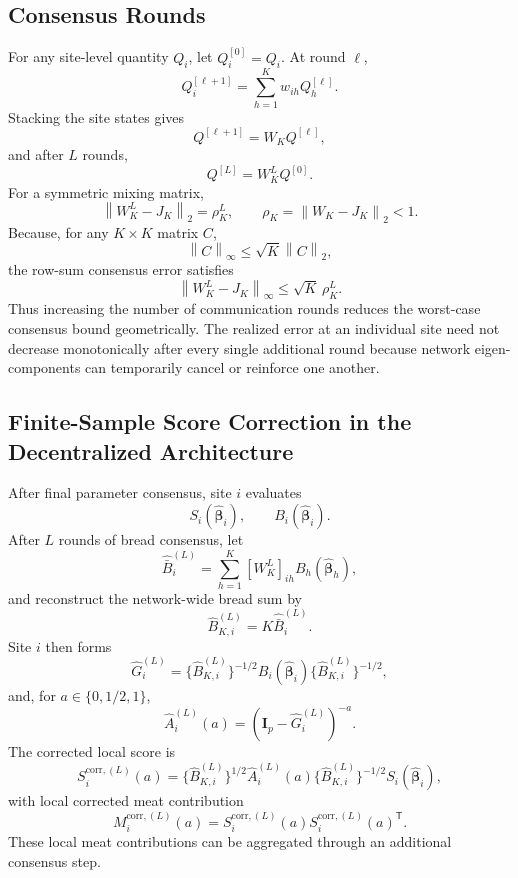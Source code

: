 \documentclass[12pt]{article}
\theoremstyle{remark}
\numberwithin{equation}{section}
\newcommand{\trans}{\mathsf{T}}
\newcommand{\bbeta}{\boldsymbol{\beta}}
\newcommand{\bI}{\mathbf I}
\newcommand{\norm}[1]{\left\lVert#1\right\rVert}
\begin{document}
\subsection{Consensus Rounds}

For any site-level quantity \(Q_i\), let \(Q_i^{[0]}=Q_i\). At round
\(\ell\),
\[
Q_i^{[\ell+1]}
=
\sum_{h=1}^K w_{ih}Q_h^{[\ell]}.
\]
Stacking the site states gives
\[
Q^{[\ell+1]}=W_KQ^{[\ell]},
\]
and after \(L\) rounds,
\[
Q^{[L]}=W_K^LQ^{[0]}.
\]
For a symmetric mixing matrix,
\[
\norm{W_K^L-J_K}_2=\rho_K^L,
\qquad
\rho_K=\norm{W_K-J_K}_2<1.
\]
Because, for any \(K\times K\) matrix \(C\),
\[
\norm{C}_{\infty}\le\sqrt K\norm{C}_2,
\]
the row-sum consensus error satisfies
\begin{equation}
\norm{W_K^L-J_K}_{\infty}
\le
\sqrt K\,\rho_K^L.
\label{eq:supp_consensus_geometric}
\end{equation}
Thus increasing the number of communication rounds reduces the worst-case
consensus bound geometrically. The realized error at an individual site need
not decrease monotonically after every single additional round because
network eigen-components can temporarily cancel or reinforce one another.


\subsection{Finite-Sample Score Correction in the Decentralized Architecture}

After final parameter consensus, site \(i\) evaluates
\[
S_i(\widehat{\bbeta}_i),
\qquad
B_i(\widehat{\bbeta}_i).
\]
After \(L\) rounds of bread consensus, let
\[
\widehat{\bar B}_i^{(L)}
=
\sum_{h=1}^K
[W_K^L]_{ih}B_h(\widehat{\bbeta}_h),
\]
and reconstruct the network-wide bread sum by
\begin{equation}
\widehat B_{K,i}^{(L)}
=
K\widehat{\bar B}_i^{(L)}.
\label{eq:supp_dec_global_bread}
\end{equation}
Site \(i\) then forms
\begin{equation}
\widehat G_i^{(L)}
=
\{\widehat B_{K,i}^{(L)}\}^{-1/2}
B_i(\widehat{\bbeta}_i)
\{\widehat B_{K,i}^{(L)}\}^{-1/2},
\label{eq:supp_dec_Gi}
\end{equation}
and, for \(a\in\{0,1/2,1\}\),
\begin{equation}
\widehat A_i^{(L)}(a)
=
(\bI_p-\widehat G_i^{(L)})^{-a}.
\label{eq:supp_dec_Ai}
\end{equation}
The corrected local score is
\begin{equation}
S_i^{\mathrm{corr},(L)}(a)
=
\{\widehat B_{K,i}^{(L)}\}^{1/2}
\widehat A_i^{(L)}(a)
\{\widehat B_{K,i}^{(L)}\}^{-1/2}
S_i(\widehat{\bbeta}_i),
\label{eq:supp_dec_corrected_score}
\end{equation}
with local corrected meat contribution
\[
M_i^{\mathrm{corr},(L)}(a)
=
S_i^{\mathrm{corr},(L)}(a)
S_i^{\mathrm{corr},(L)}(a)^{\trans}.
\]
These local meat contributions can be aggregated through an additional
consensus step.
\end{document}
